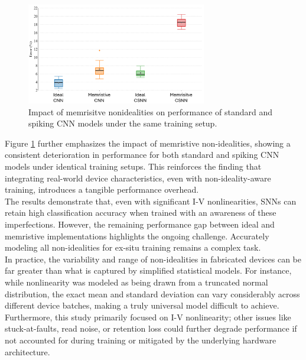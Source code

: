 \begin{figure}[htbp!] 
    \centering    
    \includegraphics[width=0.7\textwidth]{Chapter6/Figs/l.png}
    \caption[Impact of memrisitve nonidealities on performance of standard and spiking CNN models under the same training setup.]{Impact of memrisitve nonidealities on performance of standard and spiking CNN models under the same training setup.}
    \label{fig:6l}
\end{figure}

\noindent Figure \ref{fig:6l} further emphasizes the impact of memristive non-idealities, showing a consistent deterioration in performance for both standard and spiking CNN models under identical training setups. This reinforces the finding that integrating real-world device characteristics, even with non-ideality-aware training, introduces a tangible performance overhead.\\

\noindent The  results demonstrate that, even with significant I-V nonlinearities, SNNs can retain high classification accuracy when trained with an awareness of these imperfections. However, the remaining performance gap between ideal and memristive implementations highlights the ongoing challenge. Accurately modeling all non-idealities for ex-situ training remains a complex task. \\

\noindent In practice, the variability and range of non-idealities in fabricated devices can be far greater than what is captured by simplified statistical models. For instance, while nonlinearity was modeled as being drawn from a truncated normal distribution, the exact mean and standard deviation can vary considerably across different device batches, making a truly universal model difficult to achieve. Furthermore, this study primarily focused on I-V nonlinearity; other issues like stuck-at-faults, read noise, or retention loss could further degrade performance if not accounted for during training or mitigated by the underlying hardware architecture.\\

